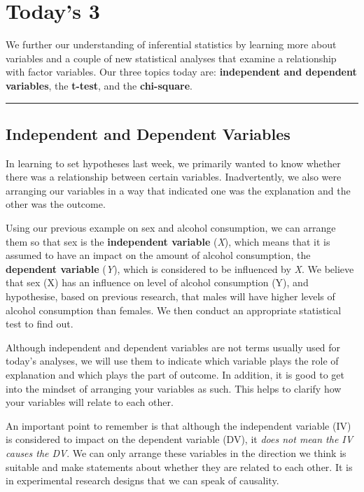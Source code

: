 \documentclass[
]{book}
\begin{document}
\hypertarget{todays-3-4}{%
\section{Today's 3}\label{todays-3-4}}

We further our understanding of inferential statistics by learning more about variables and a couple of new statistical analyses that examine a relationship with factor variables. Our three topics today are: \textbf{independent and dependent variables}, the \textbf{t-test}, and the \textbf{chi-square}.

\begin{center}\rule{0.5\linewidth}{0.5pt}\end{center}

\hypertarget{independent-and-dependent-variables}{%
\subsection{Independent and Dependent Variables}\label{independent-and-dependent-variables}}

In learning to set hypotheses last week, we primarily wanted to know whether there was a relationship between certain variables. Inadvertently, we also were arranging our variables in a way that indicated one was the explanation and the other was the outcome.

Using our previous example on sex and alcohol consumption, we can arrange them so that sex is the \textbf{independent variable} (\emph{X}), which means that it is assumed to have an impact on the amount of alcohol consumption, the \textbf{dependent variable} (\emph{Y}), which is considered to be influenced by \emph{X}. We believe that sex (X) has an influence on level of alcohol consumption (Y), and hypothesise, based on previous research, that males will have higher levels of alcohol consumption than females. We then conduct an appropriate statistical test to find out.

Although independent and dependent variables are not terms usually used for today's analyses, we will use them to indicate which variable plays the role of explanation and which plays the part of outcome. In addition, it is good to get into the mindset of arranging your variables as such. This helps to clarify how your variables will relate to each other.

An important point to remember is that although the independent variable (IV) is considered to impact on the dependent variable (DV), it \emph{does not mean the IV causes the DV}. We can only arrange these variables in the direction we think is suitable and make statements about whether they are related to each other. It is in experimental research designs that we can speak of causality.
\end{document}
